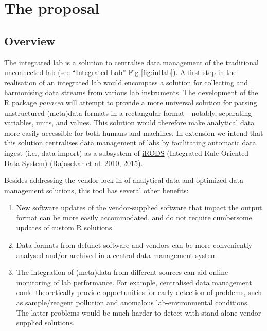 \documentclass[]{article}
\providecommand{\tightlist}{%
  \setlength{\itemsep}{0pt}\setlength{\parskip}{0pt}}
\begin{document}
\hypertarget{the-proposal}{%
\section{The proposal}\label{the-proposal}}

\hypertarget{overview}{%
\subsection{Overview}\label{overview}}

The integrated lab is a solution to centralise data management of the traditional unconnected lab (see ``Integrated Lab'' Fig \ref{fig:intlab}). A first step in the realisation of an integrated lab would encompass a solution for collecting and harmonising data streams from various lab instruments. The development of the R package \emph{panacea} will attempt to provide a more universal solution for parsing unstructured (meta)data formats in a rectangular format---notably, separating variables, units, and values. This solution would therefore make analytical data more easily accessible for both humans and machines. In extension we intend that this solution centralises data management of labs by facilitating automatic data ingest (i.e., data import) as a subsystem of \href{https://irods.org/}{iRODS} (Integrated Rule-Oriented Data System) (Rajasekar et al. 2010, 2015).

Besides addressing the vendor lock-in of analytical data and optimized data management solutions, this tool has several other benefits:

\begin{enumerate}
\def\labelenumi{\arabic{enumi}.}
\tightlist
\item
  New software updates of the vendor-supplied software that impact the output format can be more easily accommodated, and do not require cumbersome updates of custom R solutions.
\item
  Data formats from defunct software and vendors can be more conveniently analysed and/or archived in a central data management system.
\item
  The integration of (meta)data from different sources can aid online monitoring of lab performance. For example, centralised data management could theoretically provide opportunities for early detection of problems, such as sample/reagent pollution and anomalous lab-environmental conditions. The latter problems would be much harder to detect with stand-alone vendor supplied solutions.
\end{enumerate}
\end{document}
